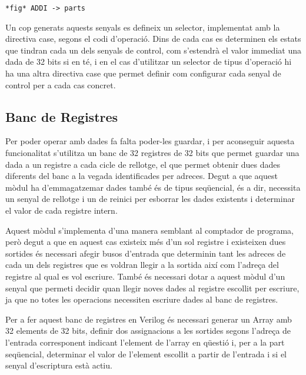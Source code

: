 \documentclass[10pt,a4paper,twocolumn,twoside]{article}
\begin{document}
    \verb|*fig* ADDI -> parts|
    
    Un cop generats aquests senyals es defineix un selector, implementat amb la directiva case, segons el codi d'operació. Dins de cada cas es determinen els estats que tindran cada un dels senyals de control, com s'estendrà el valor immediat una dada de 32 bits si en té, i en el cas d'utilitzar un selector de tipus d'operació hi ha una altra directiva case que permet definir com configurar cada senyal de control per a cada cas concret.
    
    
    
    
    
    \subsection{Banc de Registres}
    Per poder operar amb dades fa falta poder-les guardar, i per aconseguir aquesta funcionalitat s'utilitza un banc de 32 registres de 32 bits que permet guardar una dada a un registre a cada cicle de rellotge, el que permet obtenir dues dades diferents del banc a la vegada identificades per adreces.
    Degut a que aquest mòdul ha d'emmagatzemar dades també és de tipus seqüencial, és a dir, necessita un senyal de rellotge i un de reinici per esborrar les dades existents i determinar el valor de cada registre intern.
    
    Aquest mòdul s'implementa d'una manera semblant al comptador de programa, però degut a que en aquest cas existeix més d'un sol registre i existeixen dues sortides és necessari afegir busos d'entrada que determinin tant les adreces de cada un dels registres que es voldran llegir a la sortida així com l'adreça del registre al qual es vol escriure. També és necessari dotar a aquest mòdul d'un senyal que permeti decidir quan llegir noves dades al registre escollit per escriure, ja que no totes les operacions necessiten escriure dades al banc de registres. 
    
    Per a fer aquest banc de registres en Verilog és necessari generar un Array amb 32 elements de 32 bits, definir dos assignacions a les sortides segons l'adreça de l'entrada corresponent indicant l'element de l'array en qüestió i, per a la part seqüencial, determinar el valor de l'element escollit a partir de l'entrada i si el senyal d'escriptura està actiu.
    
\end{document}
